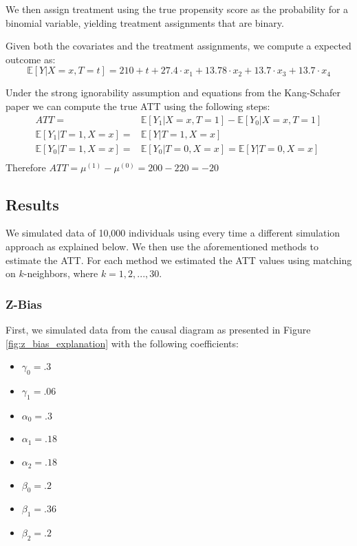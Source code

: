 \documentclass{article}
\begin{document}
We then assign treatment using the true propensity score as the probability for a binomial variable, yielding treatment assignments that are binary. 

Given both the covariates and the treatment assignments, we compute a expected outcome as:
\begin{equation*}
    \mathbb{E}[Y|X=x, T=t] = 210 + t + 27.4 \cdot{} x_1 + 13.78 \cdot{} x_2 + 13.7 \cdot{} x_3 + 13.7 \cdot{} x_4
\end{equation*}

Under the strong ignorability assumption and equations from the Kang-Schafer paper we can compute the true ATT using the following steps:
\begin{equation*}
    \begin{split}
        ATT = & \mathbb{E}[Y_1 | X=x, T=1] - \mathbb{E}[Y_0 | X=x, T=1] \\
        \mathbb{E}[Y_1|T=1, X=x] = & \mathbb{E}[Y|T=1, X=x] \\
        \mathbb{E}[Y_0|T=1, X=x] = & \mathbb{E}[Y_0|T=0, X=x] = \mathbb{E}[Y|T=0, X=x] \\
    \end{split}
\end{equation*}
Therefore $ATT=\mu{}^{(1)} - \mu{}^{(0)} = 200-220 = -20$ 




\subsection{Results}
We simulated data of 10,000 individuals using every time a different simulation approach as explained below. 
We then use the aforementioned methods to estimate the ATT.
For each method we estimated the ATT values using matching on $k$-neighbors, where $k = 1, 2, ..., 30$. 



\subsubsection{Z-Bias}
First, we simulated data from the causal diagram as presented in Figure \ref{fig:z_bias_explanation} with the following coefficients:
\begin{itemize}
    \item $\gamma_0 = .3$
    \item $\gamma_1 = .06$
    \item $\alpha_0 = .3$
    \item $\alpha_1 = .18$
    \item $\alpha_2 = .18$ 
    \item $\beta_0 = .2$
    \item $\beta_1 = .36$ 
    \item $\beta_2 = .2$
\end{itemize}
\end{document}
